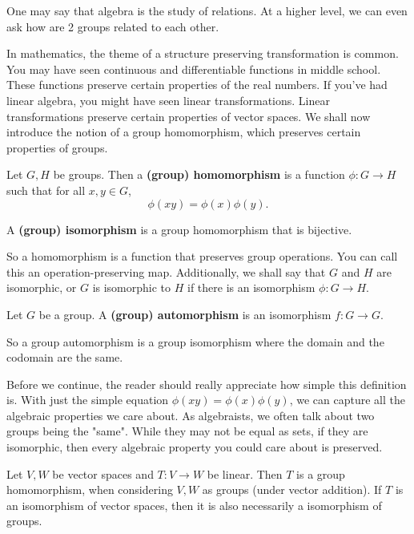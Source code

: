 \documentclass[./main.tex]{subfiles}
\begin{document}
One may say that algebra is the study of relations. At a higher level, we can
even ask how are 2 groups related to each other. 

In mathematics, the theme of a structure preserving transformation is common.
You may have seen continuous and differentiable functions in middle school.
These functions preserve certain properties of the real numbers. If you've had
linear algebra, you might have seen linear transformations. Linear
transformations preserve certain properties of vector spaces. We shall now
introduce the notion of a group homomorphism, which preserves certain properties
of groups.
\begin{definition}
\label{def:group-homomorphism}
Let $G, H$ be groups. Then a \textbf{(group) homomorphism} is a function $\phi:
G \to H$ such that for all $x, y \in G$,
\[
    \phi(xy) = \phi(x)\phi(y).
\]  

A \textbf{(group) isomorphism} is a group homomorphism that is bijective. 
\end{definition}
So a homomorphism is a function that preserves group operations. You can call
this an operation-preserving map. Additionally, we shall say that $G$ and $H$
are isomorphic, or $G$ is isomorphic to $H$ if there is an isomorphism $\phi: G
\to H$. 

\begin{definition}
\label{def:group-automorphism}
Let $G$ be a group. A \textbf{(group) automorphism} is an isomorphism $f: G \to G$.
\end{definition}
So a group automorphism is a group isomorphism where the domain and the codomain
are the same.

Before we continue, the reader should really appreciate how simple this
definition is. With just the simple equation $\phi(xy) = \phi(x)\phi(y)$, we can
capture all the algebraic properties we care about. As algebraists, we often
talk about two groups being the "same". While they may not be equal as sets, if
they are isomorphic, then every algebraic property you could care about is
preserved.

\begin{example}
    Let $V, W$ be vector spaces and $T: V \to W$ be linear. Then $T$ is a group
    homomorphism, when considering $V, W$ as groups (under vector addition). If
    $T$ is an isomorphism of vector spaces, then it is also necessarily a
    isomorphism of groups.
\end{example}
\end{document}
